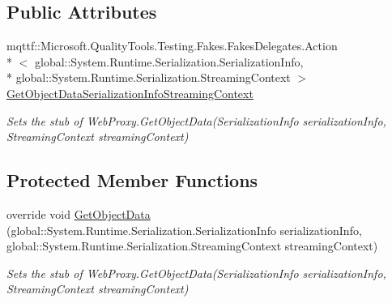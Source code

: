 \subsection*{Public Attributes}
\begin{DoxyCompactItemize}
\item 
mqttf\-::\-Microsoft.\-Quality\-Tools.\-Testing.\-Fakes.\-Fakes\-Delegates.\-Action\\*
$<$ global\-::\-System.\-Runtime.\-Serialization.\-Serialization\-Info, \\*
global\-::\-System.\-Runtime.\-Serialization.\-Streaming\-Context $>$ \hyperlink{class_system_1_1_net_1_1_fakes_1_1_stub_web_proxy_a9a70e4c97cfd90c79a1ea33bb1c5db37}{Get\-Object\-Data\-Serialization\-Info\-Streaming\-Context}
\begin{DoxyCompactList}\small\item\em Sets the stub of Web\-Proxy.\-Get\-Object\-Data(\-Serialization\-Info serialization\-Info, Streaming\-Context streaming\-Context)\end{DoxyCompactList}\end{DoxyCompactItemize}
\subsection*{Protected Member Functions}
\begin{DoxyCompactItemize}
\item 
override void \hyperlink{class_system_1_1_net_1_1_fakes_1_1_stub_web_proxy_a727e75375cb4906fcda8164a26605da0}{Get\-Object\-Data} (global\-::\-System.\-Runtime.\-Serialization.\-Serialization\-Info serialization\-Info, global\-::\-System.\-Runtime.\-Serialization.\-Streaming\-Context streaming\-Context)
\begin{DoxyCompactList}\small\item\em Sets the stub of Web\-Proxy.\-Get\-Object\-Data(\-Serialization\-Info serialization\-Info, Streaming\-Context streaming\-Context)\end{DoxyCompactList}\end{DoxyCompactItemize}
